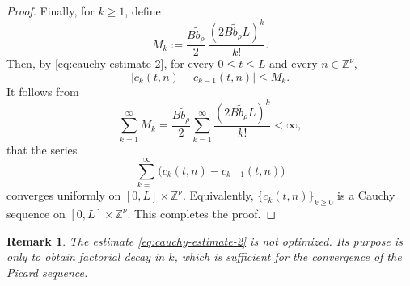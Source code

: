 \documentclass[12pt,reqno,tbtags]{amsart}
\newtheorem{remark}{Remark}[section]
\newcommand\1{\mathbbm{1}}
\begin{document}
\begin{proof}
Finally, for $k\geq 1$, define
\[
M_k:=\frac{B\widetilde b_{\rho}}{2}\,
\frac{(2B\widetilde b_{\rho}L)^k}{k!}.
\]
Then, by \eqref{eq:cauchy-estimate-2}, for every $0\leq t\leq L$ and every
$n\in \mathbb{Z}^{\nu}$,
\[
|c_k(t,n)-c_{k-1}(t,n)|\leq M_k.
\]
It follows from
\[
\sum_{k=1}^{\infty} M_k
=
\frac{B\widetilde b_{\rho}}{2}
\sum_{k=1}^{\infty}
\frac{(2B\widetilde b_{\rho}L)^k}{k!}
<\infty,
\]
that the series
\[
\sum_{k=1}^{\infty} \big(c_k(t,n)-c_{k-1}(t,n)\big)
\]
converges uniformly on $[0,L]\times \mathbb{Z}^{\nu}$. Equivalently,
$\{c_k(t,n)\}_{k\geq 0}$ is a Cauchy sequence on $[0,L]\times \mathbb{Z}^{\nu}$.
This completes the proof.
\end{proof}

\begin{remark}\label{rem:cauchy-remark}
The estimate \eqref{eq:cauchy-estimate-2} is not optimized. Its purpose is only to
obtain factorial decay in $k$, which is sufficient for the convergence of the Picard
sequence. 

\end{remark}
\end{document}

